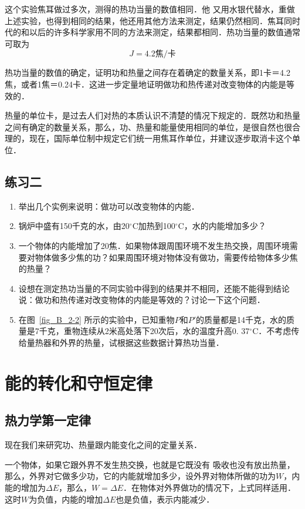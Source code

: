 这个实验焦耳做过多次，测得的热功当量的数值相同．他
又用水银代替水，重做上述实验，也得到相同的结果，他还用其他方法来测定，结果仍然相同．焦耳同时代的和以后的许多科学家用不同的方法来测定，结果都相同．热功当量的数值通常可取为
\[ J=4.2\text{焦/卡} \]

热功当量的数值的确定，证明功和热量之间存在着确定的数量关系，即1卡＝4.2焦，或者1焦＝0.24卡．这进一步定量地证明做功和热传递对改变物体的内能是等效的．

热量的单位卡，是过去人们对热的本质认识不清楚的情况下规定的．既然功和热量之间有确定的数量关系，那么，功、热量和能量使用相同的单位，是很自然也很合理的，现在，国际单位制中规定它们统一用焦耳作单位，并建议逐步取消卡这个单位．

\subsection*{练习二}
\begin{enumerate}
\item 举出几个实例来说明：做功可以改变物体的内能．
\item 锅炉中盛有150千克的水，由20$^\circ$C加热到100$^\circ$C，水的内能增加多少？
\item 一个物体的内能增加了20焦．如果物体跟周围环境不发生热交换，周围环境需要对物体做多少焦的功？如果周围环境对物体没有做功，需要传给物体多少焦的热量？
\item 设想在测定热功当量的不同实验中得到的结果并不相同，还能不能得到结论说：做功和热传递对改变物体的内能是等效的？讨论一下这个问题．
\item 在图~\ref{fig_B_2-2} 所示的实验中，已知重物$P$和$P'$的质量都是14千克，水的质量是7千克，重物连续从2米高处落下20次后，水的温度升高0. 37$^\circ$C．不考虑传给量热器和外界的热量，试根据这些数据计算热功当量．
\end{enumerate}



\section{能的转化和守恒定律}
\subsection{热力学第一定律} 

现在我们来研究功、热量跟内能变化之间的定量关系．

一个物体，如果它跟外界不发生热交换，也就是它既没有
吸收也没有放出热量，那么，外界对它做多少功，它的内能就增加多少，设外界对物体所做的功为$W$，内能的增加为$\Delta E$，那么，$W=\Delta E$．在物体对外界做功的情况下，上式同样适用．这时$W$为负值，内能的增加$\Delta E$也是负值，表示内能减少．

